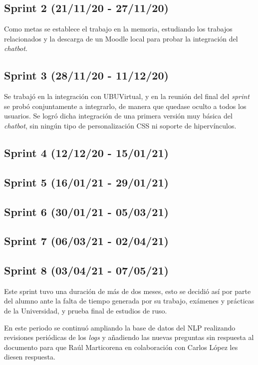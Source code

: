 \subsection{Sprint 2 (21/11/20 - 27/11/20)}

Como metas se establece el trabajo en la memoria, estudiando los trabajos relacionados y la descarga de un Moodle local para probar la integración del \textit{chatbot}.

\subsection{Sprint 3 (28/11/20 - 11/12/20)}

Se trabajó en la integración con UBUVirtual, y en la reunión del final del \textit{sprint} se probó conjuntamente a integrarlo, de manera que quedase oculto a todos los usuarios. 
Se logró dicha integración de una primera versión muy básica del \textit{chatbot}, sin ningún tipo de personalización CSS ni soporte de hipervínculos.

\subsection{Sprint 4 (12/12/20 - 15/01/21)}
\subsection{Sprint 5 (16/01/21 - 29/01/21)}

\subsection{Sprint 6 (30/01/21 - 05/03/21)}

\subsection{Sprint 7 (06/03/21 - 02/04/21)}

\subsection{Sprint 8 (03/04/21 - 07/05/21)}

Este sprint tuvo una duración de más de dos meses, esto se decidió así por parte del alumno ante la falta de tiempo generada por su trabajo, exámenes y prácticas de la Universidad, y prueba final de estudios de ruso.

En este periodo se continuó ampliando la base de datos del NLP realizando revisiones periódicas de los \textit{logs} y añadiendo las nuevas preguntas sin respuesta al documento para que Raúl Marticorena en colaboración con Carlos López les diesen respuesta.

